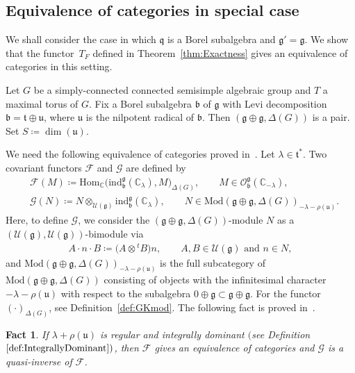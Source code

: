 \documentclass[pdftex]{sigma}
\numberwithin{equation}{section}
\newtheorem{Fact}[Theorem]{Fact}
\theoremstyle{definition}
\newcommand{\Hom}{\mathrm{Hom}}
\newcommand{\BasicRing}[1]{\mathbb{#1}}
\newcommand{\CC}{\BasicRing{C}}
\newcommand{\Mod}{\mathrm{Mod}}
\newcommand{\lieC}[1]{\mathfrak{#1}}
\newcommand{\lie}[1]{\mathfrak{#1}}
\newcommand{\univ}[1]{\mathcal{U}(\lieC{#1})}
\newcommand{\ind}[2]{\mathrm{ind}^{\lieC{#1}}_{\lieC{#2}}}
\newcommand{\BGGcat}[2]{\mathcal{O}_{\lie{#2}}^{\lie{#1}}}
\newcommand{\rhog}[1]{\rho(#1)}
\begin{document}
\subsection{Equivalence of categories in special case}

We shall consider the case in which $\lie{q}$ is a Borel subalgebra and $\lie{g'} = \lie{g}$.
We show that the functor~$T_F$ defined in Theorem~\ref{thm:Exactness} gives an equivalence of categories in this setting.

Let $G$ be a simply-connected connected semisimple algebraic group and $T$ a maximal torus of $G$.
Fix a Borel subalgebra $\lie{b}$ of $\lie{g}$ with Levi decomposition $\lie{b}=\lie{t}\oplus \lie{u}$, where $\lie{u}$ is the nilpotent radical of $\lie{b}$.
Then $(\lie{g\oplus g}, \Delta(G))$ is a pair.
Set $S\coloneq \dim(\lie{u})$.

\newcommand{\functF}{\mathcal{F}}
\newcommand{\functG}{\mathcal{G}}

We need the following equivalence of categories proved in~\cite[Theorem~5.9]{BeGe80_projective_functor}.
Let $\lambda \in \lie{t}^*$.
Two covariant functors $\functF$ and $\functG$ are defined by
\begin{align*}
	&\functF(M)\coloneq \Hom_{\CC}\bigl(\ind{g}{b}(\CC_{\lambda}), M\bigr)_{\Delta(G)}, \qquad M \in \BGGcat{g}{b}(\CC_{-\lambda}), \\
	&\functG(N)\coloneq N \otimes_{\univ{g}} \ind{g}{b}(\CC_{\lambda}), \qquad N \in \Mod(\lie{g\oplus g}, \Delta(G))_{-\lambda-\rhog{\lie{u}}}.
\end{align*}
Here, to define $\functG$, we consider the $(\lie{g}\oplus \lie{g}, \Delta(G))$-module $N$
as a $(\univ{g}, \univ{g})$-bimodule via
\begin{align*}
	A\cdot n \cdot B \coloneq \bigl(A \otimes {}^t\!B\bigr)n, \qquad A,B \in \univ{g} \text{ and }n \in N,
\end{align*}
and $\Mod(\lie{g\oplus g}, \Delta(G))_{-\lambda-\rhog{\lie{u}}}$ is the full subcategory of $\Mod(\lie{g\oplus g}, \Delta(G))$
consisting of objects with the infinitesimal character $-\lambda-\rhog{\lie{u}}$ with respect to the subalgebra $0\oplus \lie{g}\subset \lie{g\oplus g}$.
For the functor $(\cdot)_{\Delta(G)}$, see Definition~\ref{def:GKmod}.
The following fact is proved in~\cite[Theorem~5.9]{BeGe80_projective_functor}.

\begin{Fact}\label{fact:BGequivalence}
	If $\lambda+\rhog{\lie{u}}$ is regular and integrally dominant $($see Definition $\ref{def:IntegrallyDominant})$,
	then $\functF$ gives an equivalence of categories and $\functG$ is a quasi-inverse of $\functF$.
\end{Fact}
\end{document}
